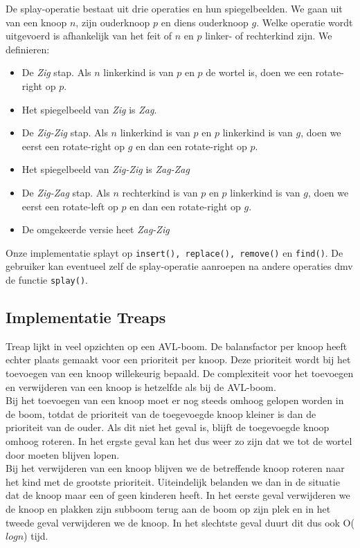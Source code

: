 \documentclass[a4paper,10pt]{article}
\begin{document}
De splay-operatie bestaat uit drie operaties en hun spiegelbeelden. We gaan uit van een knoop $n$, zijn ouderknoop $p$ en diens ouderknoop $g$. Welke operatie wordt uitgevoerd is afhankelijk van het feit of $n$ en $p$ linker- of rechterkind zijn. We definieren:
\begin{itemize}
\item De \emph{Zig} stap. Als $n$ linkerkind is van $p$ en $p$ de wortel is, doen we een rotate-right op $p$.
\item Het spiegelbeeld van \emph{Zig} is \emph{Zag}.
\item De \emph{Zig-Zig} stap. Als $n$ linkerkind is van $p$ en $p$ linkerkind is van $g$, doen we eerst een rotate-right op $g$ en dan een rotate-right op $p$.
\item Het spiegelbeeld van \emph{Zig-Zig} is \emph{Zag-Zag}
\item De \emph{Zig-Zag} stap. Als $n$ rechterkind is van $p$ en $p$ linkerkind is van $g$, doen we eerst een rotate-left op $p$ en dan een rotate-right op $g$.
\item De omgekeerde versie heet \emph{Zag-Zig}
\end{itemize}
Onze implementatie splayt op \texttt{insert(), replace(), remove()} en \texttt{find()}. De gebruiker kan eventueel zelf de splay-operatie aanroepen na andere operaties dmv de functie \texttt{splay()}.

\subsection{Implementatie Treaps}
Treap lijkt in veel opzichten op een AVL-boom. De balansfactor per knoop heeft echter plaats gemaakt voor een prioriteit per knoop. Deze prioriteit wordt bij het toevoegen van een knoop willekeurig bepaald. De complexiteit voor het toevoegen en verwijderen van een knoop is hetzelfde als bij de AVL-boom. \\

Bij het toevoegen van een knoop moet er nog steeds omhoog gelopen worden in de boom, totdat de prioriteit van de toegevoegde knoop kleiner is dan de prioriteit van de ouder. Als dit niet het geval is, blijft de toegevoegde knoop omhoog roteren. In het ergste geval kan het dus weer zo zijn dat we tot de wortel door moeten blijven lopen. \\

Bij het verwijderen van een knoop blijven we de betreffende knoop roteren naar het kind met de grootste prioriteit. Uiteindelijk belanden we dan in de situatie dat de knoop maar een of geen kinderen heeft.
In het eerste geval verwijderen we de knoop en plakken zijn subboom terug aan de boom op zijn plek en in het tweede geval verwijderen we de knoop. In het slechtste geval duurt dit dus ook O($logn$) tijd.
\end{document}
